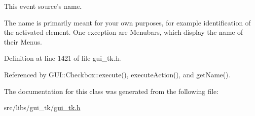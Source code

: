 This event source's name. 

The name is primarily meant for your own purposes, for example identification of the activated element. One exception are Menubars, which display the name of their Menus. 

Definition at line 1421 of file gui\-\_\-tk.\-h.



Referenced by G\-U\-I\-::\-Checkbox\-::execute(), execute\-Action(), and get\-Name().



The documentation for this class was generated from the following file\-:\begin{DoxyCompactItemize}
\item 
src/libs/gui\-\_\-tk/\hyperlink{gui__tk_8h}{gui\-\_\-tk.\-h}\end{DoxyCompactItemize}
